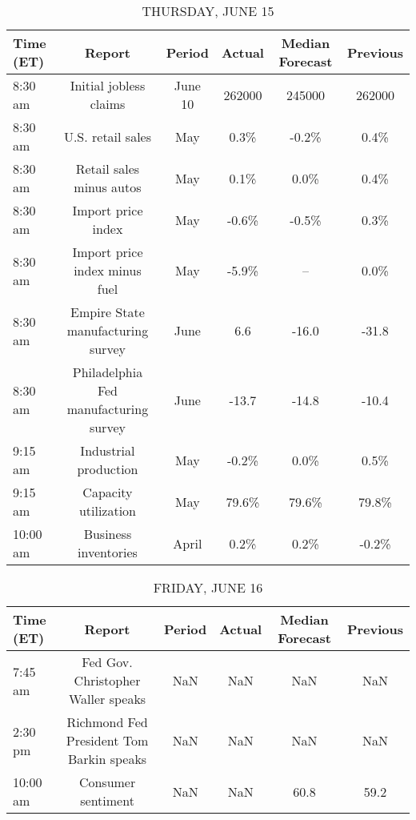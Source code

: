 \documentclass{article}%
\begin{document}
\begin{table}[htbp]%
\caption{THURSDAY, JUNE 15}%
\centering%
\begin{adjustbox}{width=1\textwidth}%
\begin{tabular}{lccccc}
\toprule
Time (ET) &                                Report &  Period & Actual & Median Forecast & Previous \\
\midrule
  8:30 am &                Initial jobless claims & June 10 & 262000 &          245000 &   262000 \\
  8:30 am &                     U.S. retail sales &     May &   0.3\% &           -0.2\% &     0.4\% \\
  8:30 am &              Retail sales minus autos &     May &   0.1\% &            0.0\% &     0.4\% \\
  8:30 am &                    Import price index &     May &  -0.6\% &           -0.5\% &     0.3\% \\
  8:30 am &         Import price index minus fuel &     May &  -5.9\% &              -- &     0.0\% \\
  8:30 am &     Empire State manufacturing survey &    June &    6.6 &           -16.0 &    -31.8 \\
  8:30 am & Philadelphia Fed manufacturing survey &    June &  -13.7 &           -14.8 &    -10.4 \\
  9:15 am &                 Industrial production &     May &  -0.2\% &            0.0\% &     0.5\% \\
  9:15 am &                  Capacity utilization &     May &  79.6\% &           79.6\% &    79.8\% \\
 10:00 am &                  Business inventories &   April &   0.2\% &            0.2\% &    -0.2\% \\
\bottomrule
\end{tabular}
%
\end{adjustbox}%
\end{table}

%


\begin{table}[htbp]%
\caption{FRIDAY, JUNE 16}%
\centering%
\begin{adjustbox}{width=1\textwidth}%
\begin{tabular}{lccccc}
\toprule
Time (ET) &                                   Report & Period & Actual & Median Forecast & Previous \\
\midrule
  7:45 am &       Fed Gov. Christopher Waller speaks &    NaN &    NaN &             NaN &      NaN \\
  2:30 pm & Richmond Fed President Tom Barkin speaks &    NaN &    NaN &             NaN &      NaN \\
 10:00 am &                       Consumer sentiment &    NaN &    NaN &            60.8 &     59.2 \\
\bottomrule
\end{tabular}
%
\end{adjustbox}%
\end{table}
\end{document}
